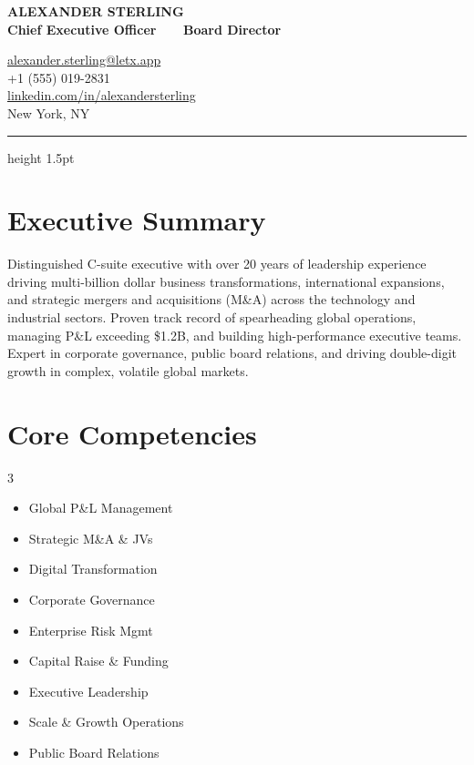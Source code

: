 \documentclass[10pt,letterpaper]{article}
\begin{document}
\color{textColor}

\noindent
\begin{minipage}[b]{0.65\textwidth}
    {\Huge\bfseries\color{primaryColor} ALEXANDER STERLING} \\
    \vspace{4pt}
    {\large\bfseries\color{accentColor} Chief Executive Officer \ \textperiodcentered\ \ Board Director}
\end{minipage}%
\begin{minipage}[b]{0.35\textwidth}
    \raggedleft
    {\color{textColor}\small
        \href{mailto:alexander.sterling@letx.app}{alexander.sterling@letx.app} \ \faEnvelope \\
        +1 (555) 019-2831 \ \faPhone* \\
        \href{https://linkedin.com/in/alexandersterling}{linkedin.com/in/alexandersterling} \ \faLinkedin \\
        New York, NY \ \faMapMarker*
    }
\end{minipage}

\vspace{8pt}
{\color{accentColor}\hrule height 1.5pt}
\vspace{10pt}

\section*{Executive Summary}
Distinguished C-suite executive with over 20 years of leadership experience driving multi-billion dollar business transformations, international expansions, and strategic mergers and acquisitions (M\&A) across the technology and industrial sectors. Proven track record of spearheading global operations, managing P\&L exceeding \$1.2B, and building high-performance executive teams. Expert in corporate governance, public board relations, and driving double-digit growth in complex, volatile global markets.

\section*{Core Competencies}
\begin{multicols}{3}
\begin{itemize}
    \item Global P\&L Management
    \item Strategic M\&A \& JVs
    \item Digital Transformation
    \item Corporate Governance
    \item Enterprise Risk Mgmt
    \item Capital Raise \& Funding
    \item Executive Leadership
    \item Scale \& Growth Operations
    \item Public Board Relations
\end{itemize}
\end{multicols}
\end{document}
